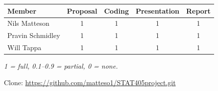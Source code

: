 \documentclass[11pt]{article}
\begin{document}
\begin{center}
\begin{tabular}{lcccc}
\toprule
Member & Proposal & Coding & Presentation & Report \\
\midrule
Nils Matteson    & 1 & 1 & 1 & 1 \\
Pravin Schmidley & 1 & 1 & 1 & 1 \\
Will Tappa       & 1 & 1 & 1 & 1 \\
\bottomrule
\end{tabular}
\end{center}

\noindent\textit{1 = full, 0.1--0.9 = partial, 0 = none.}

\vspace{0.5em}
\noindent Clone: \url{https://github.com/matteso1/STAT405project.git}
\end{document}
